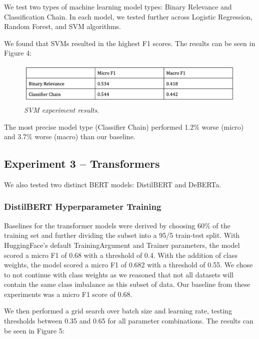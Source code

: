 \documentclass[11pt]{article}
\begin{document}
We test two types of machine learning model types: Binary Relevance and Classification Chain. In each model, we tested further across Logistic Regression, Random Forest, and SVM algorithms. 

We found that SVMs resulted in the highest F1 scores. The results can be seen in Figure 4:

\begin{figure}
    \centering
    \includegraphics[width=\columnwidth]{exp_2_results}
    \caption{\textit{SVM experiment results.}}
\end{figure}

The most precise model type (Classifier Chain) performed 1.2\% worse (micro) and 3.7\% worse (macro) than our baseline.


\subsection{Experiment 3 – Transformers}

We also tested two distinct BERT models: DistilBERT and DeBERTa.

\subsubsection{DistilBERT Hyperparameter Training}

Baselines for the transformer models were derived by choosing 60\% of the training set and further dividing the subset into a 95/5 train-test split. 
With HuggingFace’s default TrainingArgument and Trainer parameters, the model scored a micro F1 of 0.68 with a threshold of 0.4. With the addition of class weights, the model scored a micro F1 of 0.682 with a threshold of 0.55. We chose to not continue with class weights as we reasoned that not all datasets will contain the same class imbalance as this subset of data. Our baseline from these experiments was a micro F1 score of 0.68.

We then performed a grid search over batch size and learning rate, testing thresholds between 0.35 and 0.65 for all parameter combinations. The results can be seen in Figure 5:
\end{document}
